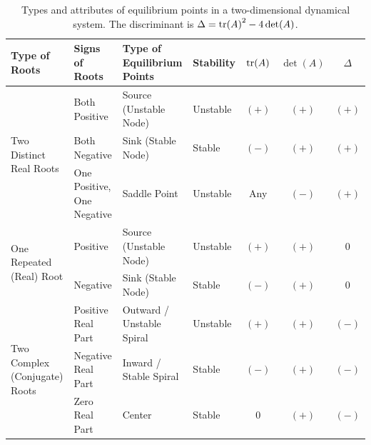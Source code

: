 \begin{table}
    \centering
    \small
    \begin{tabular}{|p{40pt}|p{48pt}|p{68pt}|p{44pt}|c|c|c|}
    \hline
    Type of Roots & Signs of Roots & Type of Equilibrium Points & Stability & $\tr(A)$ & $\det(A)$ & $\Delta$ \\
    \hline
    \multirow{3}{40pt}{Two Distinct Real Roots} & Both Positive & Source (Unstable Node) & Unstable & $(+)$ & $(+)$ & $(+)$ \\
    \hhline{~------}
     & Both Negative & Sink (Stable Node) & Stable & $(-)$ & $(+)$ & $(+)$ \\
    \hhline{~------} 
    & One Positive, One Negative & Saddle Point & Unstable & Any & $(-)$ & $(+)$ \\
    \hline
    \multirow{2}{40pt}{One Repeated (Real) Root} & Positive & Source (Unstable Node) & Unstable & $(+)$ & $(+)$ & $0$ \\
    \hhline{~------}
     & Negative & Sink (Stable Node) & Stable & $(-)$ & $(+)$ & $0$ \\
    \hline
    \multirow{3}{40pt}{Two Complex (Conjugate) Roots} & Positive Real Part & Outward / Unstable Spiral & Unstable & $(+)$ & $(+)$ & $(-)$ \\
    \hhline{~------}
     & Negative Real Part & Inward / Stable Spiral & Stable & $(-)$ & $(+)$ & $(-)$ \\
    \hhline{~------} 
    & Zero Real Part & Center & Stable & $0$ & $(+)$ & $(-)$ \\
    \hline
    \end{tabular}
    \caption{Types and attributes of equilibrium points in a two-dimensional dynamical system. The discriminant is $\Delta = \tr(A)^2 - 4\det(A)$.}
    \label{tab:equilpts}
\end{table}


